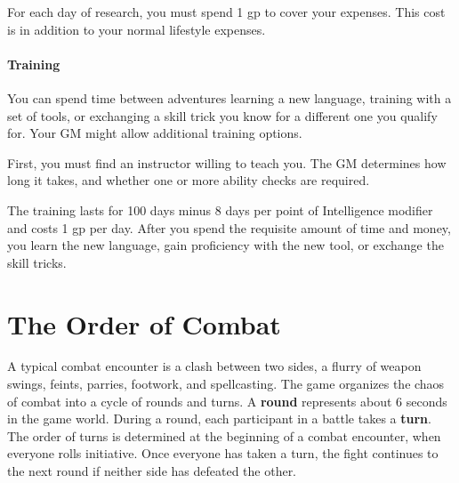 For each day of research, you must spend 1 gp to cover your expenses. This cost is in addition to your normal lifestyle expenses.

\subsubsection{Training}

You can spend time between adventures learning a new language, training with a set of tools, or exchanging a skill trick you know for a different one you qualify for. Your GM might allow additional training options.

First, you must find an instructor willing to teach you. The GM determines how long it takes, and whether one or more ability checks are required.

The training lasts for 100 days minus 8 days per point of Intelligence modifier and costs 1 gp per day. After you spend the requisite amount of time and money, you learn the new language, gain proficiency with the new tool, or exchange the skill tricks.

\chapter{The Order of Combat}\label{ch:order-of-combat}
A typical combat encounter is a clash between two sides, a flurry of weapon swings, feints, parries, footwork, and spellcasting. The game organizes the chaos of combat into a cycle of rounds and turns. A \textbf{round} represents about 6 seconds in the game world. During a round, each participant in a battle takes a \textbf{turn}. The order of turns is determined at the beginning of a combat encounter, when everyone rolls initiative. Once everyone has taken a turn, the fight continues to the next round if neither side has defeated the other.

